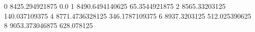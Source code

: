 0 8425.294921875 0.0
1 8490.6494140625 65.3544921875
2 8565.33203125 140.037109375
4 8771.4736328125 346.1787109375
6 8937.3203125 512.025390625
8 9053.373046875 628.078125

